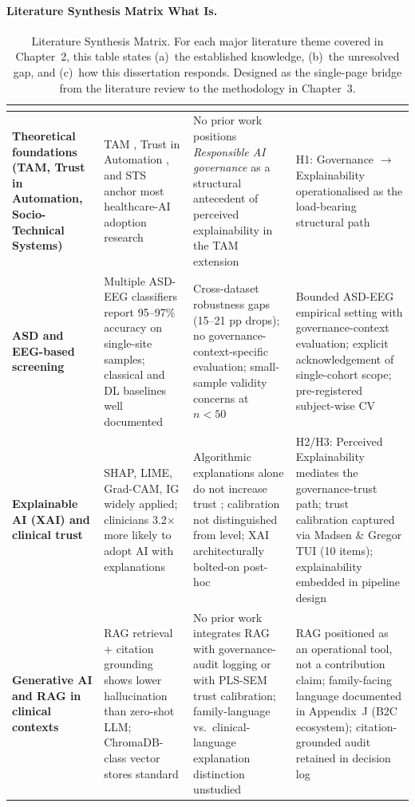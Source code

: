 {\paragraph{Literature Synthesis Matrix What Is.}
\begin{xltabular}{\textwidth}{@{} >{\bfseries}p{2.4cm} p{3.5cm} p{4.1cm} p{4.2cm} @{}}
\caption[Literature Synthesis Matrix --- What is known / missing / how this study responds]{Literature Synthesis Matrix. For each major literature theme covered in Chapter~2, this table states (a)~the established knowledge, (b)~the unresolved gap, and (c)~how this dissertation responds. Designed as the single-page bridge from the literature review to the methodology in Chapter~3.}\label{tab:ch2_synthesis_matrix} \\
\toprule
{} &  &  &  \\
\midrule
\endfirsthead
\endhead
\bottomrule
\endlastfoot
Theoretical foundations (TAM, Trust in Automation, Socio-Technical Systems) & TAM \cite{davis1989tam}, Trust in Automation \cite{lee2004trust}, and STS \cite{cherns1976principles} anchor most healthcare-AI adoption research & No prior work positions \emph{Responsible AI governance} as a structural antecedent of perceived explainability in the TAM extension & H1: Governance $\to$ Explainability operationalised as the load-bearing structural path \\
ASD and EEG-based screening & Multiple ASD-EEG classifiers report 95--97\% accuracy on single-site samples; classical and DL baselines well documented & Cross-dataset robustness gaps (15--21 pp drops); no governance-context-specific evaluation; small-sample validity concerns at $n < 50$ & Bounded ASD-EEG empirical setting with governance-context evaluation; explicit acknowledgement of single-cohort scope; pre-registered subject-wise CV \\
Explainable AI (XAI) and clinical trust & SHAP, LIME, Grad-CAM, IG widely applied; clinicians 3.2$\times$ more likely to adopt AI with explanations & Algorithmic explanations alone do not increase trust \cite{holzinger2022xai}; calibration not distinguished from level; XAI architecturally bolted-on post-hoc & H2/H3: Perceived Explainability mediates the governance-trust path; trust calibration captured via Madsen \& Gregor TUI (10 items); explainability embedded in pipeline design \\
Generative AI and RAG in clinical contexts & RAG retrieval + citation grounding shows lower hallucination than zero-shot LLM; ChromaDB-class vector stores standard & No prior work integrates RAG with governance-audit logging or with PLS-SEM trust calibration; family-language vs.\ clinical-language explanation distinction unstudied & RAG positioned as an operational tool, not a contribution claim; family-facing language documented in Appendix~J (B2C ecosystem); citation-grounded audit retained in decision log \\

\end{xltabular}}
